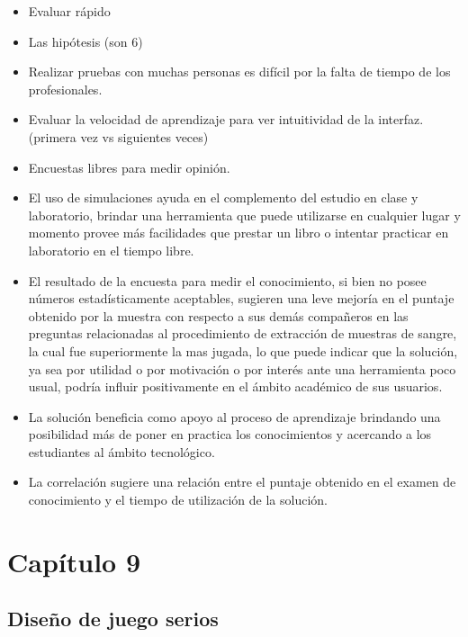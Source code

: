 \begin{itemize}

\item Evaluar rápido
\item Las hipótesis (son 6)
\item Realizar pruebas con muchas personas es difícil por la falta de tiempo de
    los profesionales.
\item Evaluar la velocidad de aprendizaje para ver intuitividad de la interfaz.
    (primera vez vs siguientes veces)
\item Encuestas libres para medir opinión.


\item El uso de simulaciones ayuda en el complemento del estudio en clase y
    laboratorio, brindar una herramienta que puede utilizarse en cualquier lugar
    y momento provee más facilidades que prestar un libro o intentar practicar
    en laboratorio en el tiempo libre.
\item El resultado de la encuesta para medir el conocimiento, si bien no posee
    números estadísticamente aceptables, sugieren una leve mejoría en el puntaje
    obtenido por la muestra con respecto a sus demás compañeros en las preguntas
    relacionadas al procedimiento de extracción de muestras de sangre, la cual
    fue superiormente la mas jugada, lo que puede indicar que la solución, ya
    sea por utilidad o por motivación o por interés ante  una herramienta poco
    usual, podría influir positivamente en el ámbito académico de sus usuarios.
\item La solución beneficia como apoyo al proceso de aprendizaje brindando una
    posibilidad más de poner en practica los conocimientos y acercando a los
    estudiantes al ámbito tecnológico.
  
\item La correlación sugiere una relación entre el puntaje obtenido en el examen
    de conocimiento y el tiempo de utilización de la solución.
\end{itemize}

\section{Capítulo 9}

\subsection{Diseño de juego serios}

